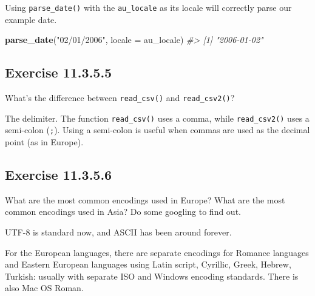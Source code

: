 \documentclass[]{book}
\newenvironment{Shaded}{\begin{snugshade}}{\end{snugshade}}
\newcommand{\CommentTok}[1]{\textcolor[rgb]{0.56,0.35,0.01}{\textit{#1}}}
\newcommand{\DataTypeTok}[1]{\textcolor[rgb]{0.13,0.29,0.53}{#1}}
\newcommand{\KeywordTok}[1]{\textcolor[rgb]{0.13,0.29,0.53}{\textbf{#1}}}
\newcommand{\NormalTok}[1]{#1}
\newcommand{\StringTok}[1]{\textcolor[rgb]{0.31,0.60,0.02}{#1}}
\theoremstyle{plain}
\theoremstyle{remark}
\begin{document}
\begin{Shaded}
\end{Shaded}

Using \texttt{parse\_date()} with the \texttt{au\_locale} as its locale will correctly parse our example date.

\begin{Shaded}
\begin{Highlighting}[]
\KeywordTok{parse_date}\NormalTok{(}\StringTok{"02/01/2006"}\NormalTok{, }\DataTypeTok{locale =}\NormalTok{ au_locale)}
\CommentTok{#> [1] "2006-01-02"}
\end{Highlighting}
\end{Shaded}

\hypertarget{exercise-11.3.5.5}{%
\subsection*{\texorpdfstring{Exercise {11.3.5.5}}{Exercise 11.3.5.5}}\label{exercise-11.3.5.5}}

What's the difference between \texttt{read\_csv()} and \texttt{read\_csv2()}?

The delimiter. The function \texttt{read\_csv()} uses a comma, while \texttt{read\_csv2()} uses a semi-colon (\texttt{;}). Using a semi-colon is useful when commas are used as the decimal point (as in Europe).

\hypertarget{exercise-11.3.5.6}{%
\subsection*{\texorpdfstring{Exercise {11.3.5.6}}{Exercise 11.3.5.6}}\label{exercise-11.3.5.6}}

What are the most common encodings used in Europe?
What are the most common encodings used in Asia?
Do some googling to find out.

UTF-8 is standard now, and ASCII has been around forever.

For the European languages, there are separate encodings for Romance languages and Eastern European languages using Latin script, Cyrillic, Greek, Hebrew, Turkish: usually with separate ISO and Windows encoding standards.
There is also Mac OS Roman.
\end{document}

